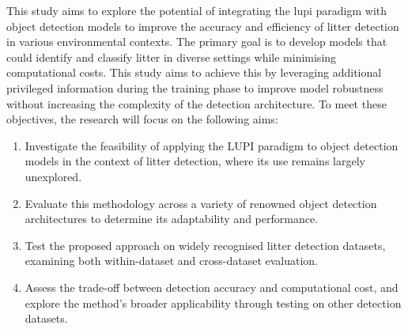 This study aims to explore the potential of integrating the \gls{lupi} paradigm with object detection models to improve the accuracy and efficiency of litter detection in various environmental contexts. The primary goal is to develop models that could identify and classify litter in diverse settings while minimising computational costs. This study aims to achieve this by leveraging additional privileged information during the training phase to improve model robustness without increasing the complexity of the detection architecture. To meet these objectives, the research will focus on the following aims:

\begin{enumerate}[label=\textbf{Objective (O\arabic*)}, leftmargin=*]
    \item Investigate the feasibility of applying the LUPI paradigm to object detection models in the context of litter detection, where its use remains largely unexplored.
    
    \item Evaluate this methodology across a variety of renowned object detection architectures to determine its adaptability and performance.
    
    \item Test the proposed approach on widely recognised litter detection datasets, examining both within-dataset and cross-dataset evaluation.
    
    \item Assess the trade-off between detection accuracy and computational cost, and explore the method’s broader applicability through testing on other detection datasets.
\end{enumerate}

